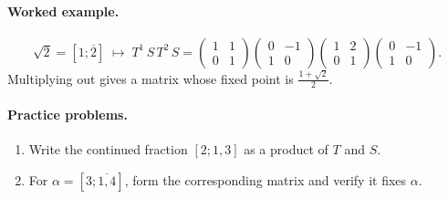\documentclass[11pt]{article}
\begin{document}
\paragraph{Worked example.}
\[
\sqrt{2}=[1;\overline{2}]
\;\longmapsto\;
T^1\,S\,T^2\,S
=\begin{pmatrix}1&1\\0&1\end{pmatrix}
\begin{pmatrix}0&-1\\1&0\end{pmatrix}
\begin{pmatrix}1&2\\0&1\end{pmatrix}
\begin{pmatrix}0&-1\\1&0\end{pmatrix}.
\]
Multiplying out gives a matrix whose fixed point is \(\frac{1+\sqrt2}2\).

\paragraph{Practice problems.}
\begin{enumerate}
  \item Write the continued fraction \([2;1,3]\) as a product of \(T\) and \(S\).
  \item For \(\alpha = [3;\overline{1,4}]\), form the corresponding matrix and verify it fixes \(\alpha\).
\end{enumerate}
\end{document}
